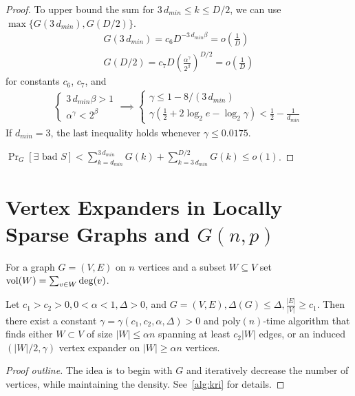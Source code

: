 \begin{proof}
    To upper bound the sum for $3\,d_{min}\leq k\leq D/2$,
    we can use $\max\{G(3\,d_{min}),G(D/2)\}$.
    \begin{gather}
        G(3\,d_{min})=c_6D^{-3\,d_{min}\beta}=o\left(\frac{1}{D}\right)\\
        G(D/2)=c_7D\left(\frac{\alpha^\gamma}{2^\beta}\right)^{D/2}=o\left(\frac{1}{D}\right)
    \end{gather}
    for constants $c_6$, $c_7$, and
    \begin{gather}
        \begin{cases}
            3\,d_{min}\beta>1\\
            \alpha^\gamma<2^\beta
        \end{cases}\implies
        \begin{cases}
            \gamma\leq1-8/(3\,d_{min})\\
            \gamma(\frac{1}{2}+2\log_2{e}-\log_2{\gamma})<\frac{1}{2}-\frac{1}{d_{min}}
        \end{cases}
    \end{gather}
    If $d_{min}=3$, the last inequality holds whenever $\gamma\leq 0.0175$.
    
    $\Pr_G[\exists\text{ bad }S]<\sum_{k=d_{min}}^{3\,d_{min}}{G(k)}
    +\sum_{k=3\,d_{min}}^{D/2}{G(k)}\leq o(1)$.
\end{proof}

\section{Vertex Expanders in Locally Sparse Graphs and \texorpdfstring{$G(n,p)$}{G(n,p)}}

For a graph $G=(V,E)$ on $n$ vertices and a subset $W\subseteq V$ set $\operatorname*{vol}(W)=\sum_{v\in W}\deg(v)$.

\begin{theorem}
    \label{thm:kri}
    Let $c_1>c_2>0, 0<\alpha<1, \Delta>0$, and
    $G=(V,E), \Delta(G)\leq\Delta,\frac{|E|}{|V|}\geq c_1$.
    Then there exist a constant $\gamma=\gamma(c_1,c_2,\alpha,\Delta)>0$
    and poly$(n)$-time algorithm that finds
    either $W\subset V$ of size $|W|\leq\alpha n$ spanning at least $c_2|W|$ edges,
    or an induced $(|W|/2,\gamma)$ vertex expander on $|W|\geq\alpha n$ vertices.
\end{theorem}

\begin{proof}[Proof outline]
    The idea is to begin with $G$ and iteratively decrease
    the number of vertices, while maintaining the density.
    See~\autoref{alg:kri} for details.
\end{proof}

